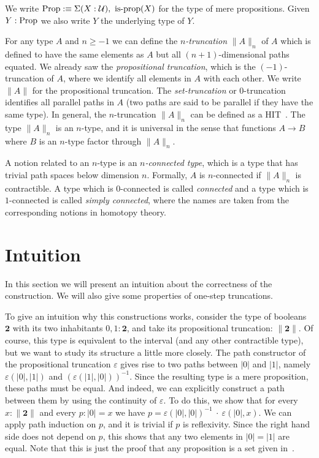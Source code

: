 \documentclass[square]{sigplanconf}
\newcommand{\ex}[2]{\ensuremath{\Sigma(#1),\ #2}}
\newcommand{\bool}{\ensuremath{\mathbf{2}}}
\newcommand{\isprop}{\textnormal{is-prop}}
\newcommand{\prop}{\textnormal{Prop}}
\newcommand{\eps}{\ensuremath{\varepsilon}}
\newcommand{\U}{\mathcal{U}}
\theoremstyle{definition}
\theoremstyle{remark}
\begin{document}
We write $\prop:\equiv \ex{X:\U}{\isprop(X)}$ for the type of mere propositions. Given $Y:\prop$
we also write $Y$ the underlying type of $Y$.

For any type $A$ and $n\geq-1$ we can define the \emph{$n$-truncation} $\|A\|_n$ of $A$ which is
defined to have the same elements as $A$ but all $(n+1)$-dimensional paths equated. We already saw
the \emph{propositional truncation}, which is the $(-1)$-truncation of $A$, where we identify all
elements in $A$ with each other. We write $\|A\|$ for the propositional truncation. The
\emph{set-truncation} or $0$-truncation identifies all parallel paths in $A$ (two paths are said to
be parallel if they have the same type). In general, the $n$-truncation $\|A\|_n$ can be defined as
a HIT~\cite[Section 7.3]{HoTTbook}. The type $\|A\|_n$ is an $n$-type, and it is universal in the
sense that functions $A\to B$ where $B$ is an $n$-type factor through $\|A\|_n$.

A notion related to an $n$-type is an \emph{$n$-connected type}, which is a type that has trivial
path spaces below dimension $n$. Formally, $A$ is $n$-connected if $\|A\|_n$ is contractible. A type
which is $0$-connected is called \emph{connected} and a type which is $1$-connected is called
\emph{simply connected}, where the names are taken from the corresponding notions in homotopy
theory.

\section{Intuition}\label{s:intuition}
In this section we will present an intuition about the correctness of the construction. We will also
give some properties of one-step truncations.

To give an intuition why this constructions works, consider the type of booleans $\bool$ with its
two inhabitants $0,1:\bool$, and take its propositional truncation: $\|\bool\|$. Of course, this
type is equivalent to the interval (and any other contractible type), but we want to study its
structure a little more closely. The path constructor of the propositional truncation $\eps$ gives
rise to two paths between $|0|$ and $|1|$, namely $\eps(|0|,|1|)$ and $(\eps(|1|,|0|))^{-1}$. Since
the resulting type is a mere proposition, these paths must be equal. And indeed, we can explicitly
construct a path between them by using the continuity of $\eps$. To do this, we show that for every
$x : \|\bool\|$ and every $p : |0| = x$ we have $p = \eps(|0|,|0|)^{-1}\ \cdot\ \eps(|0|,x)$. We can
apply path induction on $p$, and it is trivial if $p$ is reflexivity. Since the right hand side does
not depend on $p$, this shows that any two elements in $|0| = |1|$ are equal. Note that this is just
the proof that any proposition is a set given in~\cite[Lemma 3.3.4]{HoTTbook}.
\end{document}
